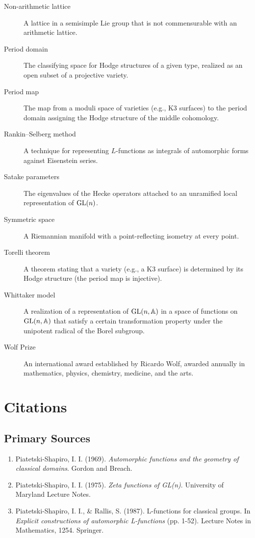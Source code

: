 \begin{description}
    \item[Non-arithmetic lattice] A lattice in a semisimple Lie group that is not commensurable with an arithmetic lattice.

    \item[Period domain] The classifying space for Hodge structures of a given type, realized as an open subset of a projective variety.

    \item[Period map] The map from a moduli space of varieties (e.g., K3 surfaces) to the period domain assigning the Hodge structure of the middle cohomology.

    \item[Rankin--Selberg method] A technique for representing \(L\)-functions as integrals of automorphic forms against Eisenstein series.

    \item[Satake parameters] The eigenvalues of the Hecke operators attached to an unramified local representation of \(\operatorname{GL}(n)\).

    \item[Symmetric space] A Riemannian manifold with a point-reflecting isometry at every point.

    \item[Torelli theorem] A theorem stating that a variety (e.g., a K3 surface) is determined by its Hodge structure (the period map is injective).

    \item[Whittaker model] A realization of a representation of \(\operatorname{GL}(n,\mathbb{A})\) in a space of functions on \(\operatorname{GL}(n,\mathbb{A})\) that satisfy a certain transformation property under the unipotent radical of the Borel subgroup.

    \item[Wolf Prize] An international award established by Ricardo Wolf, awarded annually in mathematics, physics, chemistry, medicine, and the arts.
\end{description}

\section{Citations}

\subsection*{Primary Sources}
\begin{enumerate}
    \item Piatetski-Shapiro, I. I. (1969). \textit{Automorphic functions and the geometry of classical domains}. Gordon and Breach.
    \item Piatetski-Shapiro, I. I. (1975). \textit{Zeta functions of GL(n)}. University of Maryland Lecture Notes.
    \item Piatetski-Shapiro, I. I., \& Rallis, S. (1987). L-functions for classical groups. In \textit{Explicit constructions of automorphic L-functions} (pp. 1-52). Lecture Notes in Mathematics, 1254. Springer.
\end{enumerate}

